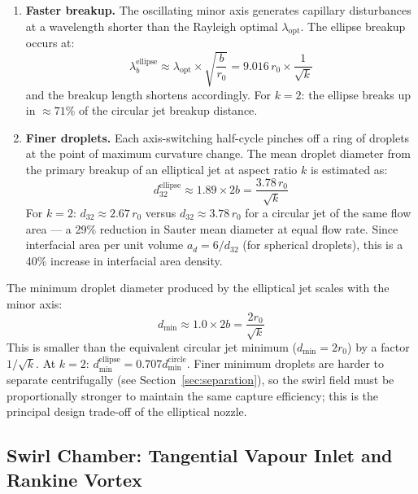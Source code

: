 \documentclass[11pt,letterpaper]{article}
\newcommand{\dsv}{d_{32}}
\newcommand{\dmin}{d_{\min}}
\begin{document}
\begin{enumerate}[nosep]
  \item \textbf{Faster breakup.}
    The oscillating minor axis generates capillary disturbances at a wavelength
    shorter than the Rayleigh optimal $\lambda_{\mathrm{opt}}$.  The ellipse
    breakup occurs at:
    \begin{equation}
      \lambda_b^{\mathrm{ellipse}} \approx \lambda_{\mathrm{opt}} \times
      \sqrt{\frac{b}{r_0}} = 9.016\,r_0\times\frac{1}{\sqrt{k}}
      \label{eq:lambda_ellipse}
    \end{equation}
    and the breakup length shortens accordingly.  For $k = 2$: the ellipse
    breaks up in $\approx 71\%$ of the circular jet breakup distance.

  \item \textbf{Finer droplets.}
    Each axis-switching half-cycle pinches off a ring of droplets at the
    point of maximum curvature change.  The mean droplet diameter from the
    primary breakup of an elliptical jet at aspect ratio $k$ is estimated as:
    \begin{equation}
      \dsv^{\mathrm{ellipse}} \approx 1.89\times 2b
      = \frac{3.78\,r_0}{\sqrt{k}}
      \label{eq:d32_ellipse}
    \end{equation}
    For $k = 2$: $\dsv \approx 2.67\,r_0$ versus $\dsv \approx 3.78\,r_0$
    for a circular jet of the same flow area --- a 29\% reduction in Sauter
    mean diameter at equal flow rate.  Since interfacial area per unit volume
    $a_d = 6/\dsv$ (for spherical droplets), this is a 40\% increase in
    interfacial area density.
\end{enumerate}

The minimum droplet diameter produced by the elliptical jet scales with
the minor axis:
\begin{equation}
  \dmin \approx 1.0\times 2b = \frac{2r_0}{\sqrt{k}}
  \label{eq:dmin}
\end{equation}
This is smaller than the equivalent circular jet minimum ($\dmin =
2r_0$) by a factor $1/\sqrt{k}$.  At $k=2$: $\dmin^{\mathrm{ellipse}} =
0.707 \dmin^{\mathrm{circle}}$.  Finer minimum droplets are
harder to separate centrifugally (see Section~\ref{sec:separation}), so
the swirl field must be proportionally stronger to maintain the same
capture efficiency; this is the principal design trade-off of the elliptical
nozzle.

\subsection{Swirl Chamber: Tangential Vapour Inlet and Rankine Vortex}
\label{sec:swirl}
\end{document}
